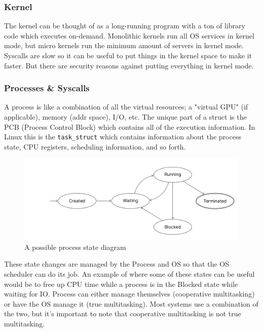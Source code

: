 \documentclass[../notes.tex]{subfiles}
\begin{document}
\subsubsection{Kernel}
The kernel can be thought of as a long-running program with a ton of library code which executes on-demand. Monolithic kernels run all OS services in kernel mode, but micro kernels run the minimum amount of servers in kernel mode. Syscalls are slow so it can be useful to put things in the kernel space to make it faster. But there are security reasons against putting everything in kernel mode.


\subsubsection{Processes & Syscalls}

A process is like a combination of all the virtual resources; a "virtual GPU" (if applicable), memory (addr space), I/O, etc.
The unique part of a struct is the PCB (Process Control Block) which contains all of the execution information. In Linux this is the \texttt{task_struct} which contains information about the process state, CPU registers, scheduling information, and so forth.


\begin{figure}[H]
  \centering
  \includegraphics[width=0.8\linewidth]{img/image_2023-01-12-15-21-01.png}
  \caption{A possible process state diagram}
\end{figure}

These state changes are managed by the Process and OS so that the OS scheduler can do its job.
An example of where some of these states can be useful would be to free up CPU time while a process is in the Blocked state while waiting for IO.
Process can either manage themselves (cooperative multitasking) or have the OS manage it (true multitasking).
Most systems use a combination of the two, but it's important to note that cooperative multitasking is not true multitasking.

\end{document}
